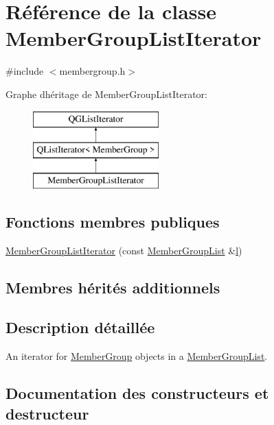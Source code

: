 \hypertarget{class_member_group_list_iterator}{}\section{Référence de la classe Member\+Group\+List\+Iterator}
\label{class_member_group_list_iterator}


{\ttfamily \#include $<$membergroup.\+h$>$}

Graphe d\textquotesingle{}héritage de Member\+Group\+List\+Iterator\+:\begin{figure}[H]
\begin{center}
\leavevmode
\includegraphics[height=3.000000cm]{class_member_group_list_iterator}
\end{center}
\end{figure}
\subsection*{Fonctions membres publiques}
\begin{DoxyCompactItemize}
\item 
\hyperlink{class_member_group_list_iterator_a59b53f24c0d48ed19052f0a93f0cbbae}{Member\+Group\+List\+Iterator} (const \hyperlink{class_member_group_list}{Member\+Group\+List} \&\hyperlink{060__command__switch_8tcl_aff56f84b49947b84b2a304f51cf8e678}{l})
\end{DoxyCompactItemize}
\subsection*{Membres hérités additionnels}


\subsection{Description détaillée}
An iterator for \hyperlink{class_member_group}{Member\+Group} objects in a \hyperlink{class_member_group_list}{Member\+Group\+List}. 

\subsection{Documentation des constructeurs et destructeur}
\hypertarget{class_member_group_list_iterator_a59b53f24c0d48ed19052f0a93f0cbbae}{}
